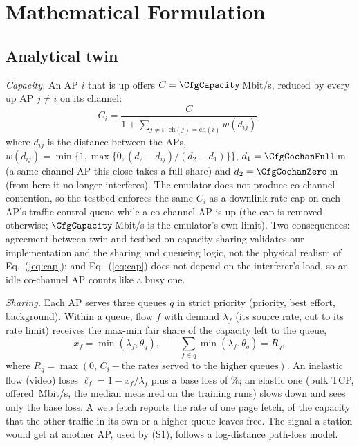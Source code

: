 \documentclass[conference]{IEEEtran}
\begin{document}
\section{Mathematical Formulation}
\subsection{Analytical twin}
\emph{Capacity.} An AP $i$ that is up offers $C=\CfgCapacity$\,Mbit/s, reduced by every up AP $j\neq i$ on its channel:
\begin{equation}
C_i=\frac{C}{1+\sum_{j\neq i,\ \mathrm{ch}(j)=\mathrm{ch}(i)} w(d_{ij})},
\label{eq:cap}
\end{equation}
where $d_{ij}$ is the distance between the APs, $w(d_{ij})=\min\{1,\max\{0,(d_2-d_{ij})/(d_2-d_1)\}\}$, $d_1=\CfgCochanFull$\,m (a same-channel AP this close takes a full share) and $d_2=\CfgCochanZero$\,m (from here it no longer interferes). The emulator does not produce co-channel contention, so the testbed enforces the same $C_i$ as a downlink rate cap on each AP's traffic-control queue while a co-channel AP is up (the cap is removed otherwise; $\CfgCapacity$\,Mbit/s is the emulator's own limit). Two consequences: agreement between twin and testbed on capacity sharing validates our implementation and the sharing and queueing logic, not the physical realism of Eq.~(\ref{eq:cap}); and Eq.~(\ref{eq:cap}) does not depend on the interferer's load, so an idle co-channel AP counts like a busy one.

\emph{Sharing.} Each AP serves three queues $q$ in strict priority (priority, best effort, background). Within a queue, flow $f$ with demand $\lambda_f$ (its source rate, cut to its rate limit) receives the max-min fair share of the capacity left to the queue,
\begin{equation}
x_f=\min(\lambda_f,\theta_q),\qquad \sum_{f\in q}\min(\lambda_f,\theta_q)=R_q,
\label{eq:share}
\end{equation}
where $R_q=\max(0,\,C_i-\text{the rates served to the higher queues})$. An inelastic flow (video) loses $\ell_f=1-x_f/\lambda_f$ plus a base loss of \CfgBaseLoss\%; an elastic one (bulk TCP, offered \CfgBulk\,Mbit/s, the median measured on the training runs) slows down and sees only the base loss. A web fetch reports the rate of one page fetch, \CfgFetch{} of the capacity that the other traffic in its own or a higher queue leaves free. The signal a station would get at another AP, used by (S1), follows a log-distance path-loss model.
\end{document}
